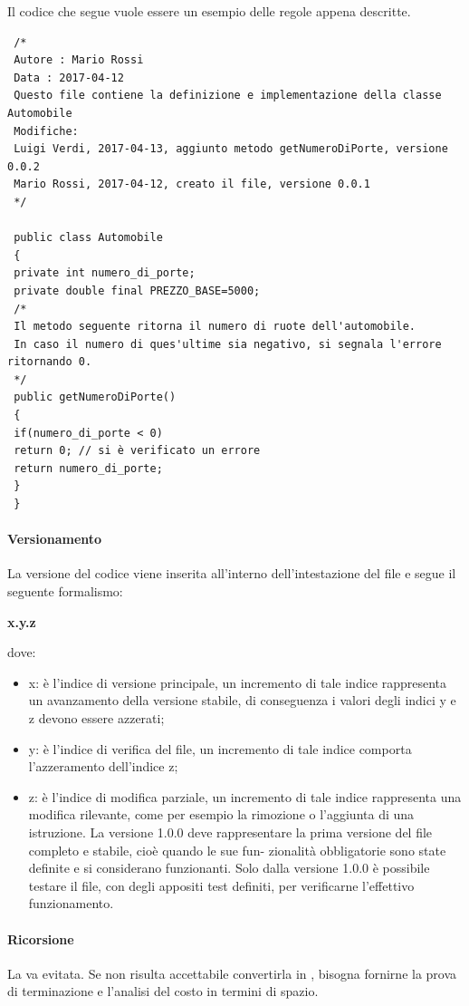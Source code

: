  Il codice che segue vuole essere un esempio delle regole appena descritte.
 \begin{verbatim}
 /* 
 Autore : Mario Rossi
 Data : 2017-04-12
 Questo file contiene la definizione e implementazione della classe Automobile
 Modifiche:
 Luigi Verdi, 2017-04-13, aggiunto metodo getNumeroDiPorte, versione 0.0.2
 Mario Rossi, 2017-04-12, creato il file, versione 0.0.1
 */
 
 public class Automobile
 {
 private int numero_di_porte;
 private double final PREZZO_BASE=5000;
 /*
 Il metodo seguente ritorna il numero di ruote dell'automobile. 
 In caso il numero di ques'ultime sia negativo, si segnala l'errore ritornando 0.
 */
 public getNumeroDiPorte()
 {
 if(numero_di_porte < 0)
 return 0; // si è verificato un errore
 return numero_di_porte;
 }
 }
 \end{verbatim}
 \newpage
 \paragraph{Versionamento}
 La versione del codice viene inserita all’interno dell’intestazione del file e segue il seguente formalismo:\\
 \centerline{\textbf{x.y.z}} dove:
  \begin{itemize}
 	\item x: è l’indice di versione principale, un incremento di tale indice rappresenta un avanzamento
 	della versione stabile, di conseguenza i valori degli indici y e z devono essere azzerati;
 	\item y: è l’indice di verifica del file, un incremento di tale indice comporta l’azzeramento
 	dell’indice z;
 	\item z: è l’indice di modifica parziale, un incremento di tale indice rappresenta una modifica
 	rilevante, come per esempio la rimozione o l’aggiunta di una istruzione. La versione 1.0.0
 	deve rappresentare la prima versione del file completo e stabile, cioè quando le sue fun-
 	zionalità obbligatorie sono state definite e si considerano funzionanti. Solo dalla versione
 	1.0.0 è possibile testare il file, con degli appositi test definiti, per verificarne l’effettivo
 	funzionamento.
 \end{itemize}
 \paragraph{Ricorsione}
 La  va evitata. Se non risulta accettabile convertirla in , bisogna fornirne la prova di terminazione e l'analisi del costo in termini di spazio.
